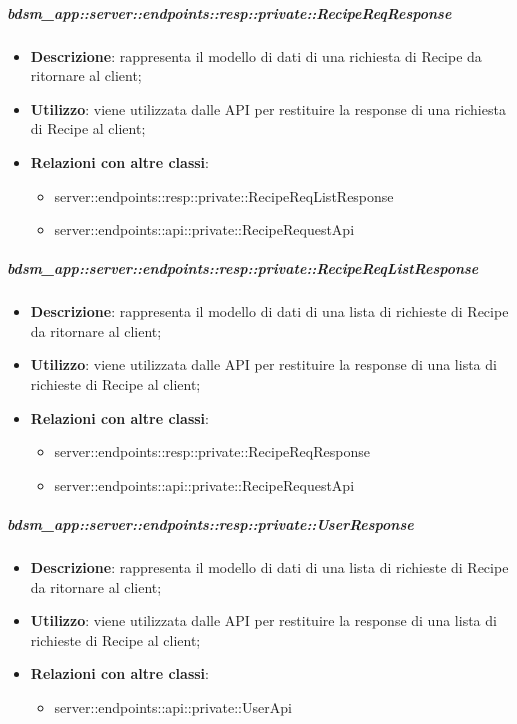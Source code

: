     \subparagraph{bdsm\_app::server::endpoints::resp::private::RecipeReqResponse} %
    \label{subp:bdsm_app_server_endpoints_resp_private_recipereqresponse}
    \begin{itemize}
      \item \textbf{Descrizione}: rappresenta il modello di dati di una richiesta di Recipe da ritornare al client;
      \item \textbf{Utilizzo}: viene utilizzata dalle API per restituire la response di una richiesta di Recipe al client;
      \item \textbf{Relazioni con altre classi}:
        \begin{itemize}
          \item server::endpoints::resp::private::RecipeReqListResponse
          \item server::endpoints::api::private::RecipeRequestApi
        \end{itemize}
      \end{itemize}
    
    \subparagraph{bdsm\_app::server::endpoints::resp::private::RecipeReqListResponse} %
    \label{subp:bdsm_app_server_endpoints_resp_private_recipereqlistresponse}
    \begin{itemize}
      \item \textbf{Descrizione}: rappresenta il modello di dati di una lista di richieste di Recipe da ritornare al client;
      \item \textbf{Utilizzo}: viene utilizzata dalle API per restituire la response di una lista di richieste di Recipe al client;
      \item \textbf{Relazioni con altre classi}:
        \begin{itemize}
          \item server::endpoints::resp::private::RecipeReqResponse
          \item server::endpoints::api::private::RecipeRequestApi
        \end{itemize}
      \end{itemize}
    
    \subparagraph{bdsm\_app::server::endpoints::resp::private::UserResponse} %
    \label{subp:bdsm_app_server_endpoints_resp_private_userresponse}
    \begin{itemize}
      \item \textbf{Descrizione}: rappresenta il modello di dati di una lista di richieste di Recipe da ritornare al client;
      \item \textbf{Utilizzo}: viene utilizzata dalle API per restituire la response di una lista di richieste di Recipe al client;
      \item \textbf{Relazioni con altre classi}:
        \begin{itemize}
          \item server::endpoints::api::private::UserApi
        \end{itemize}
      \end{itemize}
    
